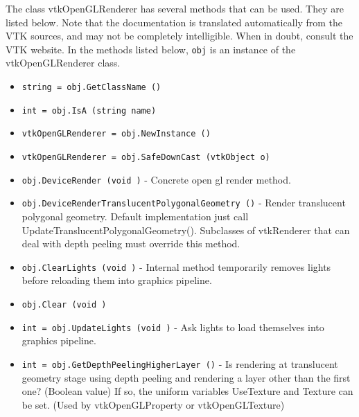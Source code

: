 The class vtkOpenGLRenderer has several methods that can be used.
  They are listed below.
Note that the documentation is translated automatically from the VTK sources,
and may not be completely intelligible.  When in doubt, consult the VTK website.
In the methods listed below, \verb|obj| is an instance of the vtkOpenGLRenderer class.
\begin{itemize}
\item  \verb|string = obj.GetClassName ()|

\item  \verb|int = obj.IsA (string name)|

\item  \verb|vtkOpenGLRenderer = obj.NewInstance ()|

\item  \verb|vtkOpenGLRenderer = obj.SafeDownCast (vtkObject o)|

\item  \verb|obj.DeviceRender (void )| -  Concrete open gl render method.

\item  \verb|obj.DeviceRenderTranslucentPolygonalGeometry ()| -  Render translucent polygonal geometry. Default implementation just call
 UpdateTranslucentPolygonalGeometry().
 Subclasses of vtkRenderer that can deal with depth peeling must
 override this method.

\item  \verb|obj.ClearLights (void )| -  Internal method temporarily removes lights before reloading them
 into graphics pipeline.

\item  \verb|obj.Clear (void )|

\item  \verb|int = obj.UpdateLights (void )| -  Ask lights to load themselves into graphics pipeline.

\item  \verb|int = obj.GetDepthPeelingHigherLayer ()| -  Is rendering at translucent geometry stage using depth peeling and
 rendering a layer other than the first one? (Boolean value)
 If so, the uniform variables UseTexture and Texture can be set.
 (Used by vtkOpenGLProperty or vtkOpenGLTexture)

\end{itemize}
